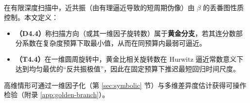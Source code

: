 在有限深度扫描中，近共振（由有理逼近导致的短周期伪像）由 $\beta$ 的丢番图性质控制。本文定义：
\begin{itemize}
  \item \textbf{（D4.4）}称扫描方向（或其一维因子旋转数）属于\textbf{黄金分支}，若其连分数部分系数在复杂度预算下取最小值，从而在同预算内最弱可逼近。
  \item \textbf{（T4.4）}在一维圆周旋转中，黄金比相关旋转数在 Hurwitz 逼近常数意义下达到均匀最优的“反共振极值”，因此在固定预算下推迟最短回归时间尺度。
\end{itemize}
高维情形可通过一维因子化（第 \ref{sec:symbolic} 节）与多维差异度估计获得可操作检验（附录 \ref{app:golden-branch}）。


